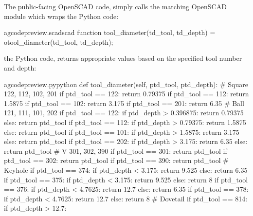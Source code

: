\documentclass{ltxdoc}
\begin{document}

The public-facing OpenSCAD code,  simply calls the matching OpenSCAD module which wraps the Python code:
 
\lstset{firstnumber=\thegcpscad}
\begin{writecode}{a}{gcodepreview.scad}{scad}
function tool_diameter(td_tool, td_depth) = otool_diameter(td_tool, td_depth);

\end{writecode}
\addtocounter{gcpscad}{2}

\noindent the Python code,  returns 
appropriate values based on the specified tool number and depth:
 
\lstset{firstnumber=\thegcpy}
\begin{writecode}{a}{gcodepreview.py}{python}
    def tool_diameter(self, ptd_tool, ptd_depth):
# Square 122, 112, 102, 201
        if ptd_tool == 122:
            return 0.79375
        if ptd_tool == 112:
            return 1.5875
        if ptd_tool == 102:
            return 3.175
        if ptd_tool == 201:
            return 6.35
# Ball 121, 111, 101, 202
        if ptd_tool == 122:
            if ptd_depth > 0.396875:
                return 0.79375
            else:
                return ptd_tool
        if ptd_tool == 112:
            if ptd_depth > 0.79375:
                return 1.5875
            else:
                return ptd_tool
        if ptd_tool == 101:
            if ptd_depth > 1.5875:
                return 3.175
            else:
                return ptd_tool
        if ptd_tool == 202:
            if ptd_depth > 3.175:
                return 6.35
            else:
                return ptd_tool
# V 301, 302, 390
        if ptd_tool == 301:
            return ptd_tool
        if ptd_tool == 302:
            return ptd_tool
        if ptd_tool == 390:
            return ptd_tool
# Keyhole
        if ptd_tool == 374:
            if ptd_depth < 3.175:
                return 9.525
            else:
                return 6.35
        if ptd_tool == 375:
            if ptd_depth < 3.175:
                return 9.525
            else:
                return 8
        if ptd_tool == 376:
            if ptd_depth < 4.7625:
                return 12.7
            else:
                return 6.35
        if ptd_tool == 378:
            if ptd_depth < 4.7625:
                return 12.7
            else:
                return 8
# Dovetail
        if ptd_tool == 814:
            if ptd_depth > 12.7:

\end{writecode}
\end{document}
